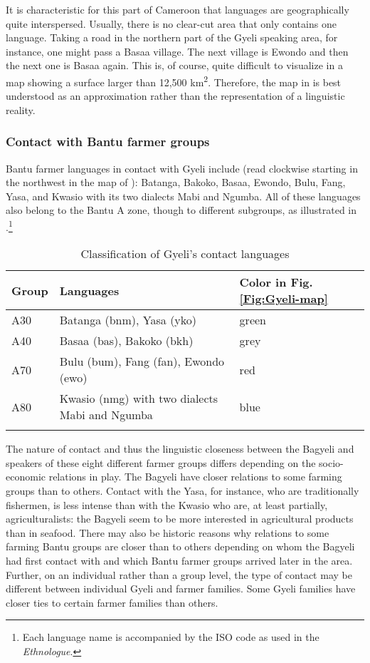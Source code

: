It is characteristic for this part of Cameroon that languages are geographically quite interspersed. Usually, there is no clear-cut area that only contains one language. Taking a road in the northern part of the Gyeli speaking area, for instance, one might pass a Basaa village. The next village is Ewondo and then the next one is Basaa again. This is, of course, quite difficult to visualize in a map showing a surface larger than 12,500 km\textsuperscript{2}. Therefore, the map in  is best understood as an approximation rather than the representation of a linguistic reality.


\subsubsection{Contact with Bantu farmer groups} 
Bantu farmer languages in contact with Gyeli include (read clockwise starting in the northwest in the map of ): Batanga, Bakoko, Basaa, Ewondo, Bulu, Fang, Yasa, and Kwasio with its two dialects Mabi and Ngumba. All of these languages also belong to the Bantu A zone, though to different subgroups, as illustrated in .\footnote{Each language name is accompanied by the ISO code as used in the {\itshape Ethnologue}.}
 
\begin{table}[t]
\begin{tabularx}{\textwidth}{lXl}
 \lsptoprule
Group & Languages & Color in Fig. \ref{Fig:Gyeli-map} \\
 \midrule
A30 & Batanga (bnm), Yasa (yko) & green \\
A40 & Basaa (bas), Bakoko (bkh) & grey \\
A70 & Bulu (bum), Fang (fan), Ewondo (ewo) & red \\
A80 & Kwasio (nmg) with two dialects Mabi and Ngumba& blue\\
 \lspbottomrule
\end{tabularx}
\caption{Classification of Gyeli's contact languages}
\label{Tab:Contact}
\end{table}

The nature of contact and thus the linguistic closeness between the Bagyeli and speakers of these eight different farmer groups differs depending on the socio-economic relations in play. The Bagyeli have closer relations to some farming groups than to others. Contact with the Yasa, for instance, who are traditionally fishermen, is less intense than with the Kwasio who are, at least partially, agriculturalists: the Bagyeli seem to be more interested in agricultural products than in seafood. There may also be historic reasons why relations to some farming Bantu groups are closer than to others depending on whom the Bagyeli had first contact with and which Bantu farmer groups arrived later in the area. Further, on an individual rather than a group level, the type of contact may be different between individual Gyeli and farmer families. Some Gyeli families have closer ties to certain farmer families than others. 

